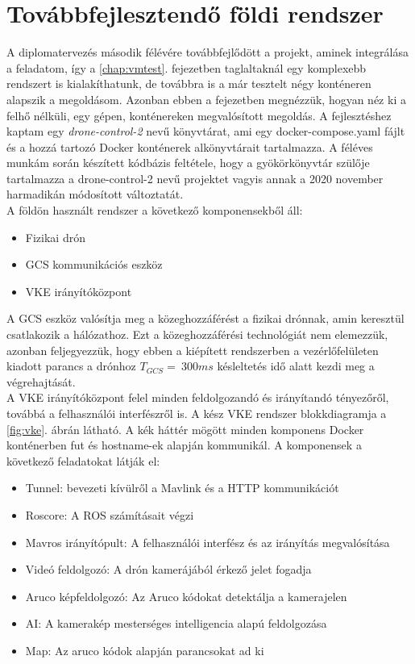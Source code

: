 \chapter{Továbbfejlesztendő földi rendszer}
\label{cha:fizikai}
A diplomatervezés második félévére továbbfejlődött a projekt, aminek integrálása a feladatom, így a \ref{chap:vmtest}. fejezetben taglaltaknál egy komplexebb rendszert is kialakíthatunk, de továbbra is a már tesztelt négy konténeren alapszik a megoldásom. Azonban ebben a fejezetben megnézzük, hogyan néz ki a felhő nélküli, egy gépen, konténereken megvalósított megoldás. A fejlesztéshez kaptam egy \emph{drone-control-2} nevű könyvtárat, ami egy docker-compose.yaml fájlt és a hozzá tartozó Docker konténerek alkönyvtárait tartalmazza. A féléves munkám során készített kódbázis feltétele, hogy a gyökörkönyvtár szülője tartalmazza a drone-control-2 nevű projektet vagyis annak a 2020 november harmadikán módosított változtatát. \\

\noindent
A földön használt rendszer a következő komponensekből áll:
\begin{itemize}
	\item Fizikai drón
	\item GCS kommunikációs eszköz
	\item VKE irányítóközpont
\end{itemize}

\noindent
A GCS eszköz valósítja meg a közeghozzáférést a fizikai drónnak, amin keresztül csatlakozik a hálózathoz. Ezt a közeghozzáférési technológiát nem elemezzük, azonban feljegyezzük, hogy ebben a kiépített rendszerben a vezérlőfelületen kiadott parancs a drónhoz $T_{GCS} = ~300 ms$ késleltetés idő alatt kezdi meg a végrehajtását. \\

\noindent
A VKE irányítóközpont felel minden feldolgozandó és irányítandó tényezőről, továbbá a felhasználói interfészről is. A kész VKE rendszer blokkdiagramja a \ref{fig:vke}. ábrán látható. A kék háttér mögött minden komponens Docker konténerben fut és hostname-ek alapján kommunikál. A komponensek a következő feladatokat látják el:
\begin{itemize}
	\item Tunnel: bevezeti kívülről a Mavlink és a HTTP kommunikációt
	\item Roscore: A ROS számításait végzi
	\item Mavros irányítópult: A felhasználói interfész és az irányítás megvalósítása
	\item Videó feldolgozó: A drón kamerájából érkező jelet fogadja
	\item Aruco képfeldolgozó: Az Aruco kódokat detektálja a kamerajelen
	\item AI: A kamerakép mesterséges intelligencia alapú feldolgozása
	\item Map: Az aruco kódok alapján parancsokat ad ki
\end{itemize}

